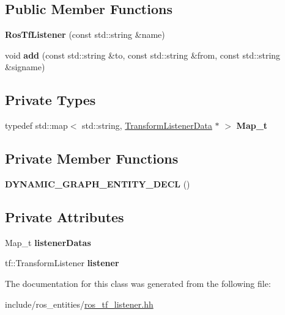 \subsection*{Public Member Functions}
\begin{DoxyCompactItemize}
\item 
\mbox{\label{classdynamic__graph_1_1RosTfListener_a475236fb89bcd8c28b28822344f6b5da}} 
{\bfseries Ros\+Tf\+Listener} (const std\+::string \&name)
\item 
\mbox{\label{classdynamic__graph_1_1RosTfListener_ad886b7323f3f7df3171e8f3be8a7218a}} 
void {\bfseries add} (const std\+::string \&to, const std\+::string \&from, const std\+::string \&signame)
\end{DoxyCompactItemize}
\subsection*{Private Types}
\begin{DoxyCompactItemize}
\item 
\mbox{\label{classdynamic__graph_1_1RosTfListener_ac0a00a872e603785083d9c3150576ac1}} 
typedef std\+::map$<$ std\+::string, \hyperlink{structdynamic__graph_1_1internal_1_1TransformListenerData}{Transform\+Listener\+Data} $\ast$ $>$ {\bfseries Map\+\_\+t}
\end{DoxyCompactItemize}
\subsection*{Private Member Functions}
\begin{DoxyCompactItemize}
\item 
\mbox{\label{classdynamic__graph_1_1RosTfListener_a1300e26161cbad01a3bc8a58d12fb2a1}} 
{\bfseries D\+Y\+N\+A\+M\+I\+C\+\_\+\+G\+R\+A\+P\+H\+\_\+\+E\+N\+T\+I\+T\+Y\+\_\+\+D\+E\+CL} ()
\end{DoxyCompactItemize}
\subsection*{Private Attributes}
\begin{DoxyCompactItemize}
\item 
\mbox{\label{classdynamic__graph_1_1RosTfListener_a45ebb4c97f34338601d5b0d2899f5a3e}} 
Map\+\_\+t {\bfseries listener\+Datas}
\item 
\mbox{\label{classdynamic__graph_1_1RosTfListener_aa18dd1498c092546813df3c10e53960d}} 
tf\+::\+Transform\+Listener {\bfseries listener}
\end{DoxyCompactItemize}


The documentation for this class was generated from the following file\+:\begin{DoxyCompactItemize}
\item 
include/ros\+\_\+entities/\hyperlink{ros__tf__listener_8hh}{ros\+\_\+tf\+\_\+listener.\+hh}\end{DoxyCompactItemize}
